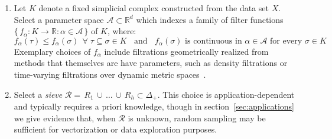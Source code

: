 \documentclass[10pt]{article}
\newenvironment{boxedenumerate}
  {\begin{mdframed}[font=\small, linewidth=1pt]}
  {\end{mdframed}}
\numberwithin{equation}{section}
\newcommand{\+}{%
	\raisebox{0.18ex}{\scaleobj{0.55}{+}}
}
\theoremstyle{definition}
\theoremstyle{definition}
\begin{document}
\begin{boxedenumerate}
\begin{enumerate}
	\item Let $K$ denote a fixed simplicial complex constructed from the data set $X$. Select a parameter space $\mathcal{A} \subset \mathbb{R}^d$ which indexes a family of filter functions $\{\, f_\alpha : K \to \mathbb{R} :  \alpha \in \mathcal{A} \, \}$ of $K$, where:
	\begin{equation}
		f_\alpha(\tau) \leq f_\alpha(\sigma) \;\, \forall \; \tau \subseteq \sigma \in K  \;\; \text{ and } \; \; f_\alpha(\sigma) \text{ is continuous in } \alpha \in \mathcal{A} \text{ for every } \sigma \in K
	\end{equation}
	Exemplary choices of $f_\alpha$ include filtrations geometrically realized from methods that themselves are have parameters, such as density filtrations or time-varying filtrations over dynamic metric spaces~\cite{kim2021spatiotemporal}. %
	\item Select a \emph{sieve} $\mathcal{R} = \, R_1 \, \cup \, \dots \, \cup \, R_h \subset \Delta_+$. %
	This choice is application-dependent and typically requires a priori knowledge, though in section~\ref{sec:applications} we give evidence that, when $\mathcal{R}$ is unknown, random sampling may be sufficient for vectorization or data exploration purposes.
	

\end{enumerate}
\end{boxedenumerate}
\end{document}
